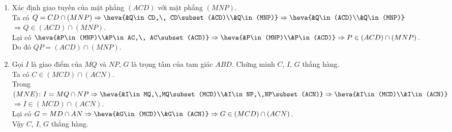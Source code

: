 \begin{bt}
{\begin{enumerate}
			Trong $(BCD)$ gọi $Q=CD\cap NE\Rightarrow \heva{&Q\in CD\\&Q\in NE,\, NE\subset (MNP)}\Rightarrow \heva{&Q\in CD\\&Q\in (MNP)}$\\
			$\Rightarrow Q=CD\cap (MNP)$.
			\item Xác định giao tuyến của mặt phẳng $(ACD)$ với mặt phẳng $(MNP)$.\\
			Ta có $Q=CD\cap (MNP)\Rightarrow \heva{&Q\in CD,\, CD\subset (ACD)\\&Q\in (MNP)}\Rightarrow \heva{&Q\in (ACD)\\&Q\in (MNP)}$\\
			$\Rightarrow Q\in (ACD)\cap (MNP)$.\\
			Lại có $\heva{&P\in (MNP)\\&P\in AC,\, AC\subset (ACD)}\Rightarrow \heva{&P\in (MNP)\\&P\in (ACD)}\Rightarrow P\in (ACD)\cap (MNP)$.\\
			Do đó $QP=(ACD)\cap (MNP)$.
			\item Gọi $I$ là giao điểm của $MQ$ và $NP$, $G$ là trọng tâm của tam giác $ABD$. Chứng minh $C$, $I$, $G$ thẳng hàng.\\
			Ta có $C\in (MCD)\cap (ACN)$.\\
			Trong $(MNE)\colon I=MQ\cap NP\Rightarrow \heva{&I\in MQ,\,MQ\subset (MCD)\\&I\in NP,\,NP\subset (ACN)}\Rightarrow \heva{&I\in (MCD)\\&I\in (ACN)}$\\
			$\Rightarrow I\in (MCD)\cap (ACN)$.\\
			Lại có $G=MD\cap AN\Rightarrow \heva{&G\in (MCD)\\&G\in (ACN)}\Rightarrow G\in (MCD)\cap (ACN)$.\\
			Vậy $C$, $I$, $G$ thẳng hàng.
		\end{enumerate}
	}
\end{bt}

